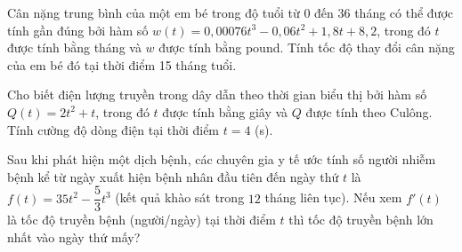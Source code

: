 \begin{ex}%
	Cân nặng trung bình của một em bé trong độ tuổi từ 0 đến 36 tháng có thể được tính gần đúng bởi hàm số $w(t)=0,00076 t^3-0,06 t^2+1,8 t+8,2$, trong đó $t$ được tính bằng tháng và $w$ được tính bằng pound. Tính tốc độ thay đổi cân nặng  của em bé đó tại thời điểm 15 tháng tuổi.\\
\end{ex}

\begin{ex}%
	Cho biết điện lượng truyền trong dây dẫn theo thời gian biểu thị bởi hàm số $Q(t)=2t^2+t$, trong đó $t$ được tính bằng giây và $Q$ được tính theo Culông. Tính cường  độ dòng điện tại thời điểm $t=4$ (s).
\end{ex}

\begin{ex}%
	Sau khi phát hiện một dịch bệnh, các chuyên gia y tế ước tính số người nhiễm bệnh kể từ ngày xuất hiện bệnh nhân đầu  tiên đến ngày thứ $t$ là $f(t)=35t^2-\dfrac{5}{3}{t^3}$ (kết quả khào sát trong $ 12 $ tháng liên tục). Nếu xem $f'(t)$ là tốc độ truyền bệnh (người/ngày) tại thời điểm $t$ thì tốc độ truyền bệnh lớn nhất vào ngày thứ mấy?
\end{ex}



